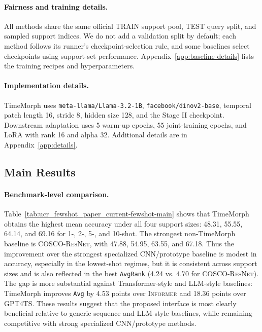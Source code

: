 \documentclass{article}
\begin{document}
\paragraph{Fairness and training details.}
All methods share the same official TRAIN support pool, TEST query split, and sampled support indices. We do not add a validation split by default; each method follows its runner's checkpoint-selection rule, and some baselines select checkpoints using support-set performance. Appendix~\ref{app:baseline-details} lists the training recipes and hyperparameters.

\paragraph{Implementation details.}
TimeMorph uses \texttt{meta-llama/Llama-3.2-1B}, \texttt{facebook/dinov2-base}, temporal patch length 16, stride 8, hidden size 128, and the Stage II checkpoint. Downstream adaptation uses 5 warm-up epochs, 55 joint-training epochs, and LoRA with rank 16 and alpha 32. Additional details are in Appendix~\ref{app:details}.

\subsection{Main Results}

\paragraph{Benchmark-level comparison.}
Table~\ref{tab:ucr_fewshot_paper_current-fewshot-main} shows that TimeMorph obtains the highest mean accuracy under all four support sizes: 48.31, 55.55, 64.14, and 69.16 for 1-, 2-, 5-, and 10-shot. The strongest non-TimeMorph baseline is \textsc{COSCO-ResNet}, with 47.88, 54.95, 63.55, and 67.18. Thus the improvement over the strongest specialized CNN/prototype baseline is modest in accuracy, especially in the lowest-shot regimes, but it is consistent across support sizes and is also reflected in the best \texttt{AvgRank} (4.24 vs. 4.70 for \textsc{COSCO-ResNet}). The gap is more substantial against Transformer-style and LLM-style baselines: TimeMorph improves \texttt{Avg} by 4.53 points over \textsc{Informer} and 18.36 points over \textsc{GPT4TS}. These results suggest that the proposed interface is most clearly beneficial relative to generic sequence and LLM-style baselines, while remaining competitive with strong specialized CNN/prototype methods.
\end{document}
